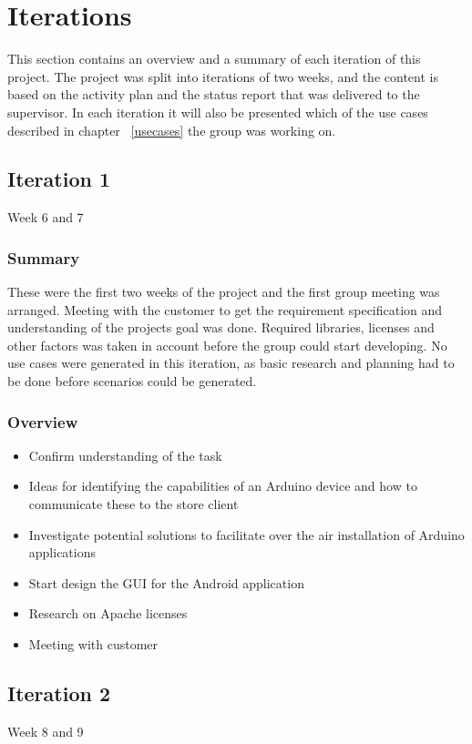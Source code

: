 \chapter{Iterations}

This section contains an overview and a summary of each iteration of this project. The project was split into
iterations of two weeks, and the content is based on the activity plan and the status report that was delivered to the supervisor. In each iteration it will also be presented which of the use cases described in chapter ~\ref{usecases} the group was working on.

\section{Iteration 1}
Week 6 and 7
\subsection{Summary}
	These were the first two weeks of the project and the first group meeting was arranged.	Meeting with the customer to get the requirement specification and understanding of the projects goal was done.	Required libraries, licenses and other factors was taken in account before the group could start developing. No use cases were generated in this iteration, as basic research and planning had to be done before scenarios could be generated.
\subsection{Overview}
\begin{itemize}
	\item{Confirm understanding of the task}
	\item{Ideas for identifying the capabilities of an Arduino device and how to communicate these to the store client}
	\item{Investigate potential solutions to facilitate over the air installation of Arduino applications}
	\item{Start design the GUI for the Android application}
	\item{Research on Apache licenses}
	\item{Meeting with customer}
\end{itemize}

\section{Iteration 2}
Week 8 and 9
